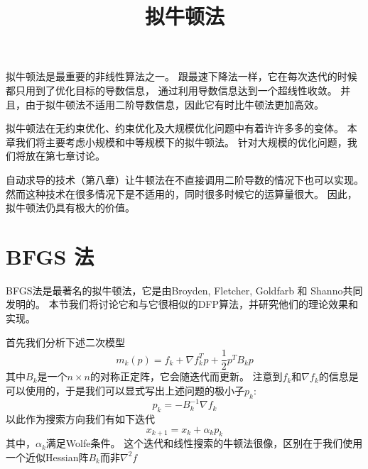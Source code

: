 \documentclass{article}
\title{拟牛顿法}
\author{}
\date{}
\begin{document}
\maketitle

拟牛顿法是最重要的非线性算法之一。
跟最速下降法一样，它在每次迭代的时候都只用到了优化目标的导数信息，
通过利用导数信息达到一个超线性收敛。
并且，由于拟牛顿法不适用二阶导数信息，因此它有时比牛顿法更加高效。

拟牛顿法在无约束优化、约束优化及大规模优化问题中有着许许多多的变体。
本章我们将主要考虑小规模和中等规模下的拟牛顿法。
针对大规模的优化问题，我们将放在第七章讨论。

自动求导的技术（第八章）让牛顿法在不直接调用二阶导数的情况下也可以实现。
然而这种技术在很多情况下是不适用的，同时很多时候它的运算量很大。
因此，拟牛顿法仍具有极大的价值。

\tableofcontents
\newpage

\section{BFGS 法}
BFGS法是最著名的拟牛顿法，它是由Broyden, Fletcher, Goldfarb 和 Shanno共同发明的。
本节我们将讨论它和与它很相似的DFP算法，并研究他们的理论效果和实现。

首先我们分析下述二次模型
\begin{equation}
    \label{eq6-1}
    m_k(p) = f_k + \nabla f_k^T p + \frac12 p^T B_k p
\end{equation}
其中$B_k$是一个$n\times n$的对称正定阵，它会随迭代而更新。
注意到$f_k$和$\nabla f_k$的信息是可以使用的，于是我们可以显式写出上述问题的极小子$p_k$:
\begin{equation}
    \label{eq6-2}
    p_k = -B_k^{-1}\nabla f_k
\end{equation}
以此作为搜索方向我们有如下迭代
\begin{equation}
    \label{eq6-3}
    x_{k+1} = x_k + \alpha_k p_k
\end{equation}
其中，$\alpha_k$满足Wolfe条件。
这个迭代和线性搜索的牛顿法很像，区别在于我们使用一个近似Hessian阵$B_k$而非$\nabla^2 f$
\end{document}
